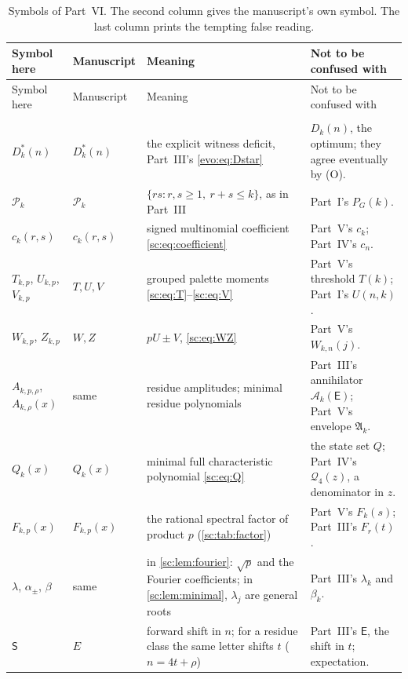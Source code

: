 \documentclass[11pt,a4paper]{article}
\numberwithin{equation}{section}
\theoremstyle{definition}
\theoremstyle{remark}
\newcommand{\nlenv}{\mathfrak A}
\begin{document}
{\small
\begin{longtable}{>{\raggedright}p{.16\linewidth}>{\raggedright}p{.13\linewidth}>{\raggedright}p{.33\linewidth}>{\raggedright\arraybackslash}p{.26\linewidth}}
\caption{Symbols of Part~VI. The second column gives the manuscript's own
symbol. The last column prints the tempting false reading.}\label{sc:tab:notation}\\
\toprule
Symbol here & Manuscript & Meaning & Not to be confused with\\
\midrule\endfirsthead
\toprule
Symbol here & Manuscript & Meaning & Not to be confused with\\
\midrule\endhead
\midrule\multicolumn{4}{r}{\footnotesize Continued on next page}\\\endfoot
\bottomrule\endlastfoot
$D^*_k(n)$ & $D_k^*(n)$ & the explicit witness deficit, Part~III's \eqref{evo:eq:Dstar} & $D_k(n)$, the optimum; they agree eventually by (O).\\
$\mathcal P_k$ & $\mathcal P_k$ & $\{rs:r,s\ge1,\ r+s\le k\}$, as in Part~III & Part~I's $P_G(k)$.\\
$c_k(r,s)$ & $c_k(r,s)$ & signed multinomial coefficient \eqref{sc:eq:coefficient} & Part~V's $c_k$; Part~IV's $c_n$.\\
$T_{k,p}$, $U_{k,p}$, $V_{k,p}$ & $T,U,V$ & grouped palette moments \eqref{sc:eq:T}--\eqref{sc:eq:V} & Part~V's threshold $T(k)$; Part~I's $U(n,k)$.\\
$W_{k,p}$, $Z_{k,p}$ & $W,Z$ & $pU\pm V$, \eqref{sc:eq:WZ} & Part~V's $W_{k,n}(j)$.\\
$A_{k,p,\rho}$, $A_{k,\rho}(x)$ & same & residue amplitudes; minimal residue polynomials & Part~III's annihilator $\mathcal A_k(\mathsf E)$; Part~V's envelope $\nlenv_k$.\\
$Q_k(x)$ & $Q_k(x)$ & minimal full characteristic polynomial \eqref{sc:eq:Q} & the state set $Q$; Part~IV's $\mathcal Q_4(z)$, a denominator in $z$.\\
$F_{k,p}(x)$ & $F_{k,p}(x)$ & the rational spectral factor of product $p$ (\cref{sc:tab:factor}) & Part~V's $F_k(s)$; Part~III's $F_r(t)$.\\
$\lambda$, $\alpha_\pm$, $\beta$ & same & in \cref{sc:lem:fourier}: $\sqrt p$ and the Fourier coefficients; in \cref{sc:lem:minimal}, $\lambda_j$ are general roots & Part~III's $\lambda_k$ and $\beta_k$.\\
$\mathsf S$ & $E$ & forward shift in $n$; for a residue class the same letter shifts $t$ ($n=4t+\rho$) & Part~III's $\mathsf E$, the shift in $t$; expectation.\\

\end{longtable}}
\end{document}
